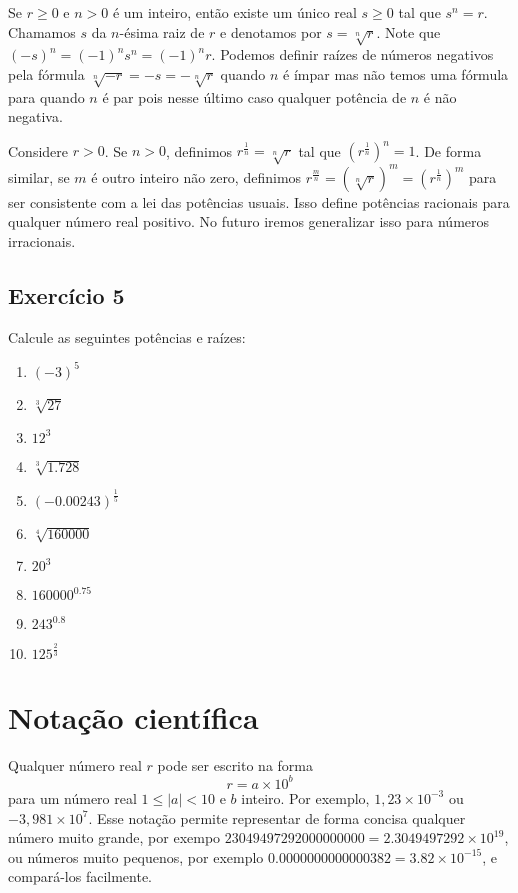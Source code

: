 Se $r \geq 0$ e $n > 0$ é um inteiro, então existe um único real $s \geq 0$ tal
que $s^n = r$. Chamamos $s$ da $n$-ésima raiz de $r$ e denotamos por
$s = \sqrt[n]{r}$.
Note que $\left(-s\right)^n = \left(-1\right)^n s^n = \left(-1\right)^n r$.
Podemos definir raízes de números negativos pela fórmula
$\sqrt[n]{-r} = -s = -\sqrt[n]{r}$
quando $n$ é ímpar mas não temos uma fórmula para quando $n$ é par
pois nesse último caso qualquer potência de $n$ é não negativa.

Considere $r > 0$.
Se $n > 0$,
definimos
$r^{\frac{1}{n}} = \sqrt[n]{r}$
tal que
$\left(r^{\frac{1}{n}}\right)^n = 1$.
De forma similar, se $m$ é outro inteiro não zero,
definimos 
$r^{\frac{m}{n}} = \left(\sqrt[n]{r}\right)^m = \left(r^{\frac{1}{n}}\right)^m$
para ser consistente com a lei das potências usuais.
Isso define potências racionais para qualquer número real positivo.
No futuro iremos generalizar isso para números irracionais.

\subsection*{Exercício 5}

Calcule as seguintes potências e raízes:

\begin{enumerate}
\item $\left(-3\right)^5$
\item $\sqrt[3]{27}$
\item $12^3$
\item $\sqrt[3]{1.728}$
\item $\left(-0.00243\right)^{\frac{1}{5}}$
\item $\sqrt[4]{160000}$
\item $20^3$
\item $160000^{0.75}$
\item $243^{0.8}$
\item $125^{\frac{2}{3}}$
\end{enumerate}

\section{Notação científica}

Qualquer número real $r$ pode ser escrito na forma
$$r = a \times 10^b$$
para um número real $1 \leq \left|a\right| < 10$ e $b$ inteiro.
Por exemplo, $1,23 \times 10^{-3}$ ou $-3,981 \times 10^{7}$.
Esse notação permite representar de forma concisa qualquer número muito grande,
por exempo $23049497292000000000 = 2.3049497292 \times 10^{19}$,
ou números muito pequenos,
por exemplo $0.0000000000000382 = 3.82 \times 10^{-15}$,
e compará-los facilmente.

